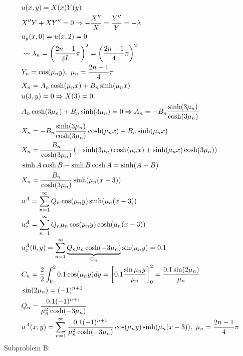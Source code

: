 \documentclass[11pt, fleqn]{article}
\begin{document}
\begin{align*}
    &u(x,y)=X(x)Y(y)\\
    &X''Y+XY''=0\Ra -\frac{X''}{X}=\frac{Y''}{Y}=-\lambda\\
    &u_y(x,0)=u(x,2)=0\\
    &\leadsto \lambda_n=\brround{\frac{2n-1}{2L}\pi}^2=\brround{\frac{2n-1}{4}\pi}^2\\
    &Y_n=\cos(\mu_n y),\ \mu_n=\frac{2n-1}{4}\pi\\
    &X_n=A_n\cosh(\mu_nx)+B_n\sinh(\mu_nx)\\
    &u(3,y)=0\Ra X(3)=0\\
    &A_n\cosh(3\mu_n)+B_n\sinh(3\mu_n)=0\Ra A_n=-B_n\frac{\sinh(3\mu_n)}{\cosh(3\mu_n)}\\
    &X_n=-B_n\frac{\sinh(3\mu_n)}{\cosh(3\mu_n)}\cosh(\mu_nx)+B_n\sinh(\mu_nx)\\
    &X_n=\frac{B_n}{\cosh(3\mu_n)}\brround{-\sinh(3\mu_n)\cosh(\mu_nx)+\sinh(\mu_nx)\cosh(3\mu_n)}\\
    &\sinh A\cosh B-\sinh B\cosh A=\sinh(A-B)\\
    &X_n=\frac{B_n}{\cosh(3\mu_n)}\sinh(\mu_n(x-3))\\
    &u^A=\sum_{n=1}^\infty Q_n\cos(\mu_n y)\sinh(\mu_n(x-3))\\
    &u_x^A=\sum_{n=1}^\infty Q_n\mu_n\cos(\mu_ny)\cosh(\mu_n(x-3))\\
    &u_x^A(0,y)=\sum_{n=1}^\infty \underbrace{Q_n\mu_n\cosh(-3\mu_n)}_{C_n}\sin(\mu_ny)=0.1\\
    &C_n=\frac{2}{2}\int_0^20.1\cos(\mu_ny)dy=\brsquare{0.1\frac{\sin{\mu_n y}}{\mu_n}}_0^2=\frac{0.1\sin(2\mu_n)}{\mu_n}\\
    &\sin(2\mu_n)=(-1)^{n+1}\\
    &Q_n=\frac{0.1(-1)^{n+1}}{\mu_n^2\cosh(-3\mu_n)}\\
    &u^A(x,y)=\sum_{n=1}^\infty\frac{0.1(-1)^{n+1}}{\mu_n^2\cosh(-3\mu_n)}\cos(\mu_ny)\sinh(\mu_n(x-3)),\ \mu_n=\frac{2n-1}{4}\pi
\end{align*}
Subproblem B:
\end{document}
